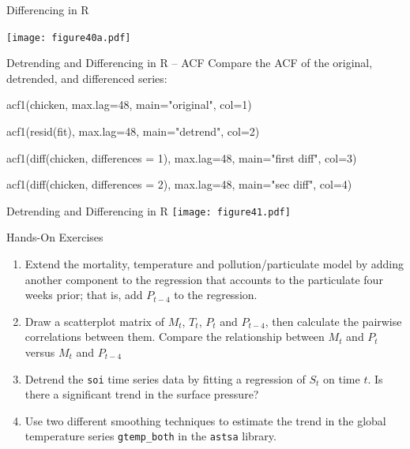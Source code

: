 \documentclass[ignorenonframetext,xcolor=x11names]{beamer}
\begin{document}
\begin{frame}{Differencing in R}
\begin{center}
\texttt{[image: figure40a.pdf]}
\end{center}
\end{frame}

\begin{frame}[fragile]{Detrending and Differencing in R -- ACF}
Compare the ACF of the original, detrended, and differenced series:
\begin{Rcode}
acf1(chicken, max.lag=48, main="original", col=1)

acf1(resid(fit), max.lag=48, main="detrend", col=2)

acf1(diff(chicken, differences = 1), max.lag=48, 
     main="first diff", col=3)

acf1(diff(chicken, differences = 2), max.lag=48, 
     main="sec diff", col=4)
\end{Rcode}
\end{frame}

\begin{frame}{Detrending and Differencing in R}
\centering
\texttt{[image: figure41.pdf]}
\end{frame}



\begin{frame}{Hands-On Exercises}
\begin{enumerate}
  \item Extend the mortality, temperature and pollution/particulate model by adding another component to the regression that accounts to the particulate four weeks prior; that is, add $P_{t-4}$ to the regression.
  \item Draw a scatterplot matrix of $M_t$, $T_t$, $P_t$ and $P_{t-4}$, then calculate the pairwise correlations between them. Compare the relationship between $M_t$ and $P_t$ versus $M_t$ and $P_{t-4}$
  \item Detrend the \texttt{soi} time series data by fitting a regression of $S_t$ on time $t$. Is there a significant trend in the surface pressure?
  \item Use two different smoothing techniques to estimate the trend in the global temperature series \texttt{gtemp\_both} in the \texttt{astsa} library.
\end{enumerate}
\end{frame}
\end{document}
